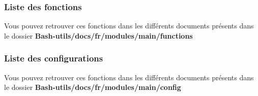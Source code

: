 \documentclass[a4paper,10pt]{article}
\begin{document}
  \color{blue}
  \subsubsection{Liste des fonctions}\color{white}
  Vous pouvez retrouver ces fonctions dans les différents documents présents dans le dossier \textbf{\color{lime}Bash-utils/docs/fr/modules/main/functions\color{white}}

  \color{blue}
  \subsubsection{Liste des configurations}\color{white}
  Vous pouvez retrouver ces fonctions dans les différents documents présents dans le dossier \textbf{\color{lime}Bash-utils/docs/fr/modules/main/config\color{white}}
    
\end{document}

